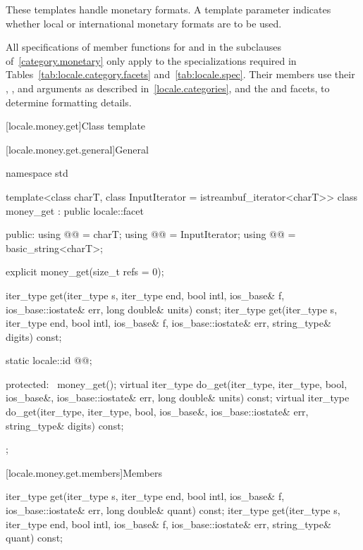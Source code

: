 \pnum
These templates handle monetary formats.
A template parameter indicates
whether local or international monetary formats are to be used.

\pnum
All specifications of member functions
for  and 
in the subclauses of~\ref{category.monetary} only apply to
the specializations required in Tables~\ref{tab:locale.category.facets}
and~\ref{tab:locale.spec}.
Their members use their , ,
and  arguments as described in~\ref{locale.categories}, and
the  and  facets,
to determine formatting details.

[locale.money.get]{Class template }

[locale.money.get.general]{General}

%
\begin{codeblock}
namespace std {
  template<class charT, class InputIterator = istreambuf_iterator<charT>>
  class money_get : public locale::facet {
  public:
    using @@   = charT;
    using @@   = InputIterator;
    using @@ = basic_string<charT>;

    explicit money_get(size_t refs = 0);

    iter_type get(iter_type s, iter_type end, bool intl,
                  ios_base& f, ios_base::iostate& err,
                  long double& units) const;
    iter_type get(iter_type s, iter_type end, bool intl,
                  ios_base& f, ios_base::iostate& err,
                  string_type& digits) const;

    static locale::id @@;

  protected:
    ~money_get();
    virtual iter_type do_get(iter_type, iter_type, bool, ios_base&,
                             ios_base::iostate& err, long double& units) const;
    virtual iter_type do_get(iter_type, iter_type, bool, ios_base&,
                             ios_base::iostate& err, string_type& digits) const;
  };
}
\end{codeblock}

[locale.money.get.members]{Members}

%
\begin{itemdecl}
iter_type get(iter_type s, iter_type end, bool intl, ios_base& f,
              ios_base::iostate& err, long double& quant) const;
iter_type get(iter_type s, iter_type end, bool intl, ios_base& f,
              ios_base::iostate& err, string_type& quant) const;
\end{itemdecl}

